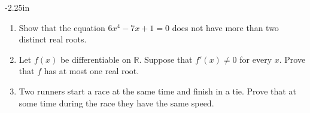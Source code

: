\begin{adjustwidth*}{}{-2.25in}
\begin{multicols*}{2}
\begin{enumerate}[1),resume]
\item Show that the equation $6x^4 -7x+1 =0$ does not have more
than two distinct real roots.

\item Let $f(x)$ be differentiable on $\mathbb{R}$. Suppose that $f'(x) \ne
0$ for every $x$. Prove that $f$ has at most one real root.


\item Two runners start a race at the same time and finish in a tie. Prove that at some time during the race they have the same speed.
\end{enumerate}

\end{multicols*}
\end{adjustwidth*}

\afterexercises